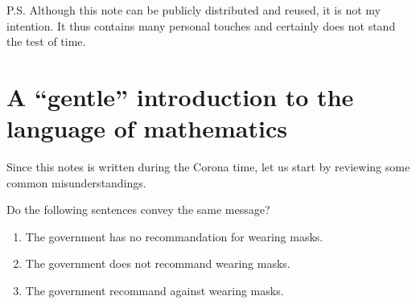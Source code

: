 \documentclass[
	fontsize=10pt, %
	twoside=true, %
	secnumdepth=1, %
	numbers=noenddot, %
]{kaobook}
\begin{document}
P.S. Although this note can be publicly distributed and reused, it is not my intention. It thus contains many personal touches and certainly does not stand the test of time.


\begingroup %

\setlength{\textheight}{23cm} %

\etocstandarddisplaystyle %
\etocstandardlines %

\tableofcontents %

\listoffigures %

\let\cleardoublepage\bigskip
\let\clearpage\bigskip


\endgroup


\mainmatter %
\chapter{A ``gentle'' introduction to the language of mathematics}

Since this notes is written during the Corona time, let us start by reviewing some common misunderstandings.

Do the following sentences convey the same message?
\begin{enumerate}
	\item The government has no recommandation for wearing masks.
	\item The government does not recommand wearing masks.
	\item The government recommand against wearing masks.
\end{enumerate}
\end{document}
